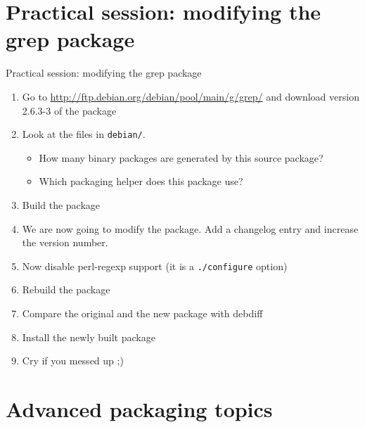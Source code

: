 \documentclass[10pt,final]{beamer}
\begin{document}
\section{Practical session: modifying the grep package}
\begin{frame}{Practical session: modifying the grep package}
  \begin{enumerate}
  \item Go to \url{http://ftp.debian.org/debian/pool/main/g/grep/} and
    download version 2.6.3-3 of the package
  \item Look at the files in \texttt{debian/}.
    \begin{itemize}
    \item 		How many binary packages are generated by this source package?
    \item 		Which packaging helper does this package use?
    \end{itemize}
  \item Build the package
  \item We are now going to modify the package. Add a changelog entry and increase the version number.
  \item Now disable perl-regexp support (it is a \texttt{./configure} option)
  \item Rebuild the package
  \item Compare the original and the new package with debdiff
  \item Install the newly built package
  \item Cry if you messed up ;)
  \end{enumerate}
\end{frame}

\section{Advanced packaging topics}
\end{document}
